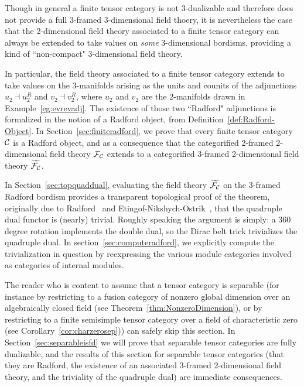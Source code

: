 \documentclass{amsart}
\begin{document}
Though in general a finite tensor category is not 3-dualizable and therefore does not provide a full 3-framed 3-dimensional field thoery, it is nevertheless the case that the 2-dimensional field theory associated to a finite tensor category can always be extended to take values on \emph{some} 3-dimensional bordisms, providing a kind of ``non-compact" 3-dimensional field theory.  

In particular, the field theory associated to a finite tensor category extends to take values on the 3-manifolds arising as the units and counits of the adjunctions $u_2 \dashv u_2^R$ and $v_2 \dashv v_2^R$, where $u_2$ and $v_2$ are the 2-manifolds drawn in Example~\ref{eg:evrevadj}.  The existence of those two ``Radford" adjunctions is formalized in the notion of a Radford object, from Definition~\ref{def:Radford-Object}.  In Section~\ref{sec:finiteradford}, we prove that every finite tensor category $\mathcal C$ is a Radford object, and as a consequence that the categorified 2-framed 2-dimensional field theory $\mathcal F_\mathcal C$ extends to a categorified 3-framed 2-dimensional field theory $\widetilde{\mathcal F_\mathcal C}$.  

In Section~\ref{sec:topquaddual}, evaluating the field theory $\widetilde{\mathcal F_\mathcal C}$ on the 3-framed Radford bordism provides a transparent topological proof of the theorem, originally due to Radford~\cite{MR0407069} and Etingof-Nikshych-Ostrik~\cite{MR2097289}, that the quadruple dual functor is (nearly) trivial.  Roughly speaking the argument is simply: a 360 degree rotation implements the double dual, so the Dirac belt trick trivializes the quadruple dual.  In section~\ref{sec:computeradford}, we explicitly compute the trivialization in question by reexpressing the various module categories involved as categories of internal modules.

The reader who is content to assume that a tensor category is separable (for instance by restricting to a fusion category of nonzero global dimension over an algebraically closed field (see Theorem~\ref{thm:NonzeroDimension}), or by restricting to a finite semisimple tensor category over a field of characteristic zero (see Corollary~\ref{cor:charzerosep})) can safely skip this section.  In Section~\ref{sec:separableisfd} we will prove that separable tensor categories are fully dualizable, and the results of this section for separable tensor categories (that they are Radford, the existence of an associated 3-framed 2-dimensional field theory, and the triviality of the quadruple dual) are immediate consequences.
\end{document}
